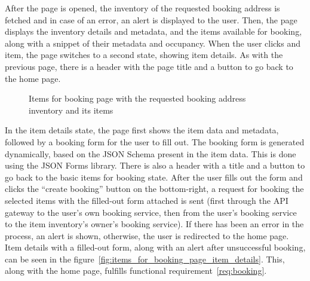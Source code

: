 After the page is opened, the inventory of the requested booking address is fetched and in case of an error, an alert is displayed to the user. Then, the page displays the inventory details and metadata, and the items available for booking, along with a snippet of their metadata and occupancy. When the user clicks and item, the page switches to a second state, showing item details. As with the previous page, there is a header with the page title and a button to go back to the home page.

\begin{figure}
    \centering
    \caption[Items for booking page]{Items for booking page with the requested booking address inventory and its items}
    \label{fig:items_for_booking_page}
\end{figure}

In the item details state, the page first shows the item data and metadata, followed by a booking form for the user to fill out. The booking form is generated dynamically, based on the JSON Schema present in the item data. This is done using the JSON Forms library. There is also a header with a title and a button to go back to the basic items for booking state. After the user fills out the form and clicks the \enquote{create booking} button on the bottom-right, a request for booking the selected items with the filled-out form attached is sent (first through the API gateway to the user's own booking service, then from the user's booking service to the item inventory's owner's booking service). If there has been an error in the process, an alert is shown, otherwise, the user is redirected to the home page. Item details with a filled-out form, along with an alert after unsuccessful booking, can be seen in the figure~\ref{fig:items_for_booking_page_item_details}. This, along with the home page, fulfills functional requirement~\ref{req:booking}.

